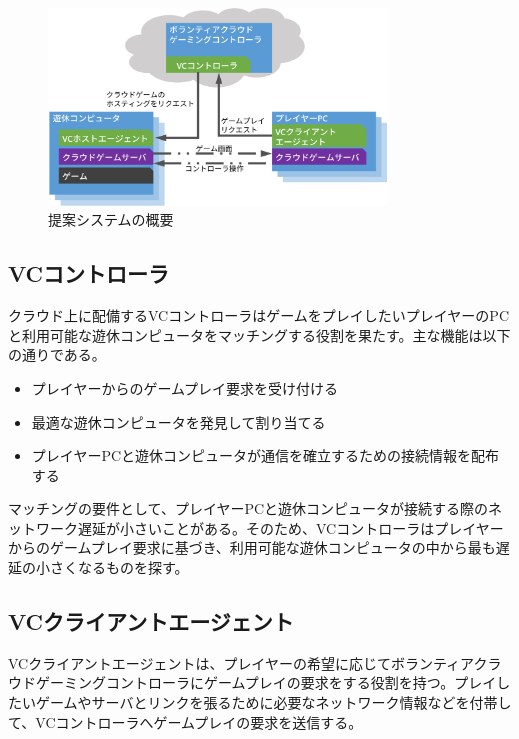 \begin{figure}[t]
    \centering
    \includegraphics[width=0.8\textwidth,keepaspectratio,clip]{img/architecture.eps}
    \caption{提案システムの概要}
    \label{fig:arch}
\end{figure}

\subsection{VCコントローラ}
クラウド上に配備するVCコントローラはゲームをプレイしたいプレイヤーのPCと利用可能な遊休コンピュータをマッチングする役割を果たす。主な機能は以下の通りである。
\begin{itemize}
    \item プレイヤーからのゲームプレイ要求を受け付ける
    \item 最適な遊休コンピュータを発見して割り当てる
    \item プレイヤーPCと遊休コンピュータが通信を確立するための接続情報を配布する
\end{itemize}
マッチングの要件として、プレイヤーPCと遊休コンピュータが接続する際のネットワーク遅延が小さいことがある。そのため、VCコントローラはプレイヤーからのゲームプレイ要求に基づき、利用可能な遊休コンピュータの中から最も遅延の小さくなるものを探す。


\subsection{VCクライアントエージェント}
VCクライアントエージェントは、プレイヤーの希望に応じてボランティアクラウドゲーミングコントローラにゲームプレイの要求をする役割を持つ。プレイしたいゲームやサーバとリンクを張るために必要なネットワーク情報などを付帯して、VCコントローラへゲームプレイの要求を送信する。

